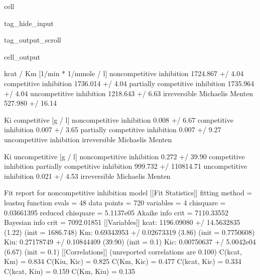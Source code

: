 \documentclass[letterpaper,10pt,english]{jupyterBook}
\begin{document}
\begin{sphinxuseclass}{cell}
\begin{sphinxuseclass}{tag_hide_input}
\begin{sphinxuseclass}{tag_output_scroll}
\begin{sphinxVerbatimOutput}
\begin{sphinxuseclass}{cell_output}
\begin{sphinxVerbatim}[commandchars=\\\{\}]
                                 kcat / Km [1/min * 1/mmole / l]  \PYGZbs{}
non\PYGZhy{}competitive inhibition                    1724.867 +/\PYGZhy{} 4.04\PYGZpc{}   
competitive inhibition                        1736.014 +/\PYGZhy{} 4.04\PYGZpc{}   
partially competitive inhibition              1735.964 +/\PYGZhy{} 4.04\PYGZpc{}   
uncompetitive inhibition                      1218.643 +/\PYGZhy{} 6.63\PYGZpc{}   
irreversible Michaelis Menten                 527.980 +/\PYGZhy{} 16.14\PYGZpc{}   

                                 Ki competitive [g / l]  \PYGZbs{}
non\PYGZhy{}competitive inhibition              0.008 +/\PYGZhy{} 6.67\PYGZpc{}   
competitive inhibition                  0.007 +/\PYGZhy{} 3.65\PYGZpc{}   
partially competitive inhibition        0.007 +/\PYGZhy{} 9.27\PYGZpc{}   
uncompetitive inhibition                              \PYGZhy{}   
irreversible Michaelis Menten                         \PYGZhy{}   

                                 Ki uncompetitive [g / l]  
non\PYGZhy{}competitive inhibition               0.272 +/\PYGZhy{} 39.90\PYGZpc{}  
competitive inhibition                                  \PYGZhy{}  
partially competitive inhibition   999.732 +/\PYGZhy{} 110814.71\PYGZpc{}  
uncompetitive inhibition                  0.021 +/\PYGZhy{} 4.53\PYGZpc{}  
irreversible Michaelis Menten                           \PYGZhy{}  
\end{sphinxVerbatim}

\begin{sphinxVerbatim}[commandchars=\\\{\}]
Fit report for non\PYGZhy{}competitive inhibition model
[[Fit Statistics]]
    \PYGZsh{} fitting method   = leastsq
    \PYGZsh{} function evals   = 48
    \PYGZsh{} data points      = 720
    \PYGZsh{} variables        = 4
    chi\PYGZhy{}square         = 0.03661395
    reduced chi\PYGZhy{}square = 5.1137e\PYGZhy{}05
    Akaike info crit   = \PYGZhy{}7110.33552
    Bayesian info crit = \PYGZhy{}7092.01851
[[Variables]]
    k\PYGZus{}cat:  1196.09080 +/\PYGZhy{} 14.5632835 (1.22\PYGZpc{}) (init = 1686.748)
    Km:     0.69343953 +/\PYGZhy{} 0.02673319 (3.86\PYGZpc{}) (init = 0.7750608)
    K\PYGZus{}iu:   0.27178749 +/\PYGZhy{} 0.10844409 (39.90\PYGZpc{}) (init = 0.1)
    K\PYGZus{}ic:   0.00750637 +/\PYGZhy{} 5.0042e\PYGZhy{}04 (6.67\PYGZpc{}) (init = 0.1)
[[Correlations]] (unreported correlations are \PYGZlt{} 0.100)
    C(k\PYGZus{}cat, Km)   = 0.834
    C(K\PYGZus{}iu, K\PYGZus{}ic)  = \PYGZhy{}0.825
    C(Km, K\PYGZus{}ic)    = 0.477
    C(k\PYGZus{}cat, K\PYGZus{}ic) = 0.334
    C(k\PYGZus{}cat, K\PYGZus{}iu) = \PYGZhy{}0.159
    C(Km, K\PYGZus{}iu)    = \PYGZhy{}0.135
\end{sphinxVerbatim}


\end{sphinxuseclass}
\end{sphinxVerbatimOutput}
\end{sphinxuseclass}
\end{sphinxuseclass}
\end{sphinxuseclass}
\end{document}
